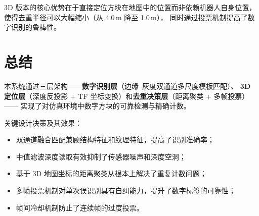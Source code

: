 \documentclass[12pt,a4paper]{article}
\begin{document}
3D 版本的核心优势在于直接定位方块在地图中的位置而非依赖机器人自身位置，
使得去重半径可以大幅缩小（从 4.0\,m 降至 1.0\,m），
同时通过投票机制提高了数字识别的鲁棒性。

\section{总结}

本系统通过三层架构——\textbf{数字识别层}（边缘--灰度双通道多尺度模板匹配）、
\textbf{3D 定位层}（深度反投影 + TF 坐标变换）和\textbf{去重决策层}（距离聚类 + 多帧投票）——
实现了对仿真环境中数字方块的可靠检测与精确计数。

关键设计决策及其效果：
\begin{itemize}
  \item 双通道融合匹配兼顾结构特征和纹理特征，提高了识别准确率；
  \item 中值滤波深度读取有效抑制了传感器噪声和深度空洞；
  \item 基于 3D 地图坐标的距离聚类从根本上解决了重复计数问题；
  \item 多帧投票机制对单次误识别具有自纠能力，提升了数字标签的可靠性；
  \item 帧间冷却机制防止了连续帧的过度投票。
\end{itemize}
\end{document}
